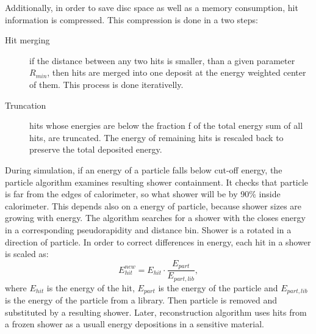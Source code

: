 Additionally, in order to save disc space as well as a memory consumption, hit information is compressed. This compression is done in a two steps: 
\begin{description}
\item [Hit merging] if the distance between any two hits is smaller, than a given parameter $R_{min}$, then hits are merged into one deposit at the energy weighted center of them. This process is done iterativelly.
\item [Truncation] hits whose energies are below the fraction f of the total energy sum of all hits, are truncated. The energy of remaining hits is rescaled back to preserve the total deposited energy.
\end{description}

During simulation, if an energy of a particle falls below cut-off energy, the particle algorithm examines resulting shower containment. It checks  that particle is far from the edges of calorimeter, so what shower will be by 90\% inside calorimeter. This depends also on a energy of particle, because shower sizes are growing with energy. The algorithm searches for a shower with the closes energy in a corresponding pseudorapidity and distance bin. Shower is a rotated in a direction of particle. In order to correct differences in energy, each hit in a shower is scaled as:
\begin{equation}
E_{hit}^{new}=E_{hit}\cdot \frac{E_{part}}{E_{part,lib}},
\end{equation}
where $E_{hit}$ is the energy of the hit, $E_{part}$ is the energy of the particle and $E_{part,lib}$ is the energy of the particle from a library. Then particle is removed and substituted by a resulting shower. Later, reconstruction algorithm uses hits from a frozen shower as a usuall energy depositions in a sensitive material. 

\begin{figure}[!tbp]
\end{figure}

\begin{figure}[!tbp]
\end{figure}

